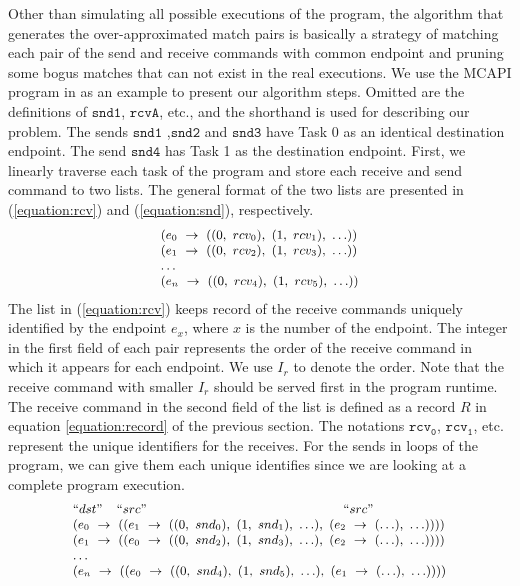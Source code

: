 Other than simulating all possible executions of the program, the algorithm that generates the over-approximated match pairs is basically a strategy of matching each pair of the send and receive commands with common endpoint and pruning some bogus matches that can not exist in the real executions. We use the MCAPI program in  as an example to present our algorithm steps. Omitted are the definitions of $\mathtt{snd1}$, $\mathtt{rcvA}$, etc., and the shorthand is used for describing our problem. The sends $\mathtt{snd1}$ ,$\mathtt{snd2}$ and $\mathtt{snd3}$ have Task 0 as an identical destination endpoint. The send $\mathtt{snd4}$ has Task 1 as the destination endpoint.
First, we linearly traverse each task of the program and store each receive and send command to two lists. The general format of the two lists are presented in (\ref{equation:rcv}) and (\ref{equation:snd}), respectively.
\begin{equation}
\footnotesize \begin{array}{l}
(e_0\ \rightarrow\ ((0,\ rcv_{0}),\ (1,\ rcv_{1}),\ \ldots))\\
(e_1\ \rightarrow\ ((0,\ rcv_{2}),\ (1,\ rcv_{3}),\ \ldots))\\
\ldots \\
(e_n\ \rightarrow\ ((0,\ rcv_{4}),\ (1,\ rcv_{5}),\ \ldots))\\
\end{array}
\label{equation:rcv}
\end{equation}
The list in (\ref{equation:rcv}) keeps record of the receive commands uniquely identified by the endpoint $\mathit{e}_x$, where $x$ is the number of the endpoint. The integer in the first field of each pair represents the order of the receive command in which it appears for each endpoint. We use $I_r$ to denote the order. Note that the receive command with smaller $I_r$ should be served first in the program runtime. The receive command in the second field of the list is defined as a record $R$ in equation \ref{equation:record} of the previous section. The notations $\mathtt{rcv_{0}}$, $\mathtt{rcv_{1}}$, etc. represent the unique identifiers for the receives. For the sends in loops of the program, we can give them each unique identifies since we are looking at a complete program execution.
\begin{equation}
\footnotesize \begin{array}{l}
 ``dst" \;\;\;\; ``src" \;\;\;\;\;\;\;\;\;\;\;\;\;\;\;\;\;\;\;\;\;\;\;\;\;\;\;\;\;\;\;\;\;\;\;\;\;\;\;\;\;\;\;\;\;\;\;\;\;\;\;\;\;\;\; ``src"\\
(e_0\ \rightarrow\ ((e_1\ \rightarrow\ ((0,\ snd_{0}),\ (1,\ snd_{1}),\ \ldots),\ (e_2\ \rightarrow\ (\ldots),\ \ldots))))\\
(e_1\ \rightarrow\ ((e_0\ \rightarrow\ ((0,\ snd_{2}),\ (1,\ snd_{3}),\ \ldots),\ (e_2\ \rightarrow\ (\ldots),\ \ldots))))\\
 \dots\\
(e_n\ \rightarrow\ ((e_0\ \rightarrow\ ((0,\ snd_{4}),\ (1,\ snd_{5}),\ \ldots),\ (e_1\ \rightarrow\ (\ldots),\ \ldots))))\\
\end{array}
\label{equation:snd}
\end{equation}
